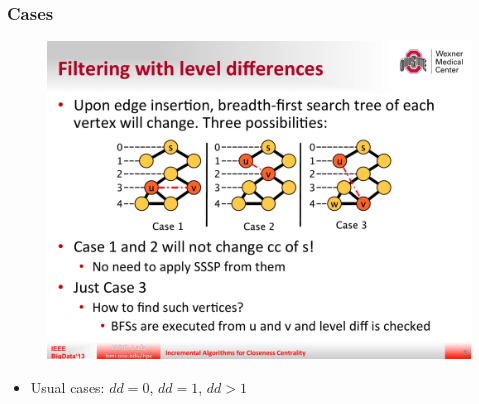 \begin{frame}
  \frametitle{Cases}

  \begin{figure}[H]
    \centering
    \includegraphics[width=\textwidth]{imgs/sksc-cases}
  \end{figure}

  \begin{itemize}
    \item Usual cases: $dd=0$, $dd=1$, $dd>1$
  \end{itemize}
\end{frame}


